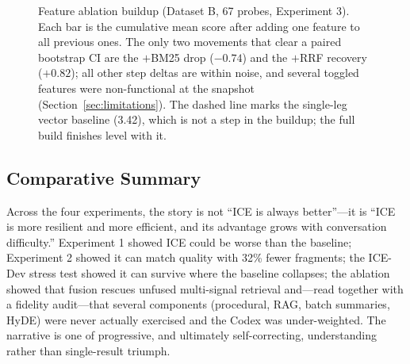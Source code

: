 \documentclass[10pt]{article}
\begin{document}
\begin{figure}[t]
\centering
{}
\caption{Feature ablation buildup (Dataset B, 67 probes, Experiment 3). Each bar is the cumulative mean score after adding one feature to all previous ones. The only two movements that clear a paired bootstrap CI are the $+$BM25 drop ($-0.74$) and the $+$RRF recovery ($+0.82$); all other step deltas are within noise, and several toggled features were non-functional at the snapshot (Section~\ref{sec:limitations}). The dashed line marks the single-leg vector baseline (3.42), which is not a step in the buildup; the full build finishes level with it.}
\label{fig:ablation-waterfall}
\end{figure}

\subsection{Comparative Summary}

Across the four experiments, the story is not ``ICE is always better''---it is ``ICE is more resilient and more efficient, and its advantage grows with conversation difficulty.'' Experiment 1 showed ICE could be worse than the baseline; Experiment 2 showed it can match quality with 32\% fewer fragments; the ICE-Dev stress test showed it can survive where the baseline collapses; the ablation showed that fusion rescues unfused multi-signal retrieval and---read together with a fidelity audit---that several components (procedural, RAG, batch summaries, HyDE) were never actually exercised and the Codex was under-weighted. The narrative is one of progressive, and ultimately self-correcting, understanding rather than single-result triumph.
\end{document}
